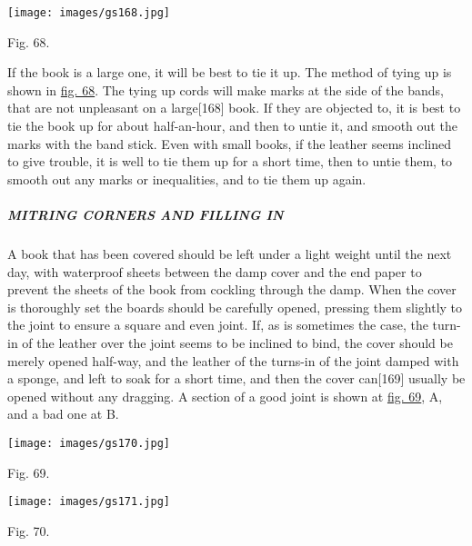\documentclass[
]{article}
\begin{document}
\protect\hypertarget{Fig_68}{}{}
\texttt{[image: images/gs168.jpg]}

Fig. 68.

If the book is a large one, it will be best to tie it up. The method of
tying up is shown in \protect\hyperlink{Fig_68}{fig. 68}. The tying up
cords will make marks at the side of the bands, that are not unpleasant
on a large{\protect\hypertarget{Page_168}{}{{[}168{]}}} book. If they
are objected to, it is best to tie the book up for about half-an-hour,
and then to untie it, and smooth out the marks with the band stick. Even
with small books, if the leather seems inclined to give trouble, it is
well to tie them up for a short time, then to untie them, to smooth out
any marks or inequalities, and to tie them up again.

\hypertarget{mitring-corners-and-filling-in}{%
\subparagraph{MITRING CORNERS AND FILLING
IN}\label{mitring-corners-and-filling-in}}

A book that has been covered should be left under a light weight until
the next day, with waterproof sheets between the damp cover and the end
paper to prevent the sheets of the book from cockling through the damp.
When the cover is thoroughly set the boards should be carefully opened,
pressing them slightly to the joint to ensure a square and even joint.
If, as is sometimes the case, the turn-in of the leather over the joint
seems to be inclined to bind, the cover should be merely opened
half-way, and the leather of the turns-in of the joint damped with a
sponge, and left to soak for a short time, and then the cover
can{\protect\hypertarget{Page_169}{}{{[}169{]}}} usually be opened
without any dragging. A section of a good joint is shown at
\protect\hyperlink{Fig_69}{fig. 69}, A, and a bad one at B.

\protect\hypertarget{Fig_69}{}{}
\texttt{[image: images/gs170.jpg]}

Fig. 69.

\protect\hypertarget{Fig_70}{}{}
\texttt{[image: images/gs171.jpg]}

Fig. 70.
\end{document}
